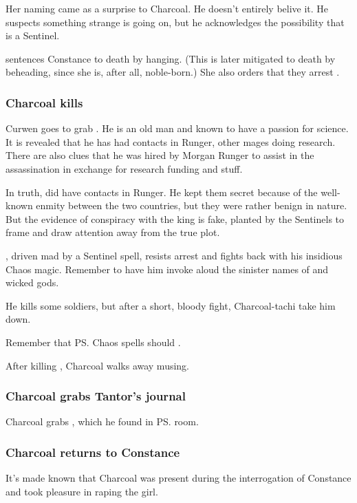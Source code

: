 \begin{garbage}
Her naming \Anatoli{} came as a surprise to Charcoal. He doesn't entirely belive it. He suspects something strange is going on, but he acknowledges the possibility that \Anatoli{} is a Sentinel. 

\Tiroco{} sentences Constance to death by hanging. (This is later mitigated to death by beheading, since she is, after all, noble-born.) She also orders that they arrest \Anatoli{}. 





\subsubsection{Charcoal kills \Onatol}
Curwen goes to grab \Anatoli{}. He is an old man and known to have a passion for science. It is revealed that he has had contacts in Runger, other mages doing research. There are also clues that he was hired by Morgan Runger to assist in the assassination in exchange for research funding and stuff. 

In truth, \Anatoli{} did have contacts in Runger. He kept them secret because of the well-known enmity between the two countries, but they were rather benign in nature. But the evidence of conspiracy with the king is fake, planted by the Sentinels to frame \Anatoli{} and draw attention away from the true plot. 

\Anatoli, driven mad by a Sentinel spell, resists arrest and fights back with his insidious Chaos magic. Remember to have him invoke aloud the sinister names of \daemons{} and wicked gods. 

He kills some soldiers, but after a short, bloody fight, Charcoal-tachi take him down. 

Remember that \ps{\Onatol} Chaos spells should . 

After killing \Anatoli{}, Charcoal walks away musing. 





\subsubsection{Charcoal grabs Tantor's journal}
Charcoal grabs , which he found in \ps{\Onatol} room.





\subsubsection{Charcoal returns to Constance}
It's made known that Charcoal was present during the interrogation of Constance and took pleasure in raping the girl. 


\end{garbage}
